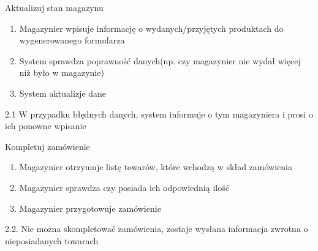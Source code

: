 	\begin{usecase}{Aktualizuj stan magazynu}
		\author{Arkadiusz Socha} 
		\maketitle
\begin{scenario}
 
			\begin{enumerate}
				\item Magazynier wpisuje informację o wydanych/przyjętych produktach do wygenerowanego formularza
				\item System sprawdza poprawność danych(np. czy magazynier nie wydał więcej niż było w magazynie)
				\item System aktualizje dane
			\end{enumerate}
		\end{scenario}
\begin{extensions}
		2.1 W przypadku błędnych danych, system informuje o tym magazyniera i prosi o ich ponowne wpisanie\\
	\end{extensions}
\end{usecase}

	\begin{usecase}{Kompletuj zamówienie}
		\author{Arkadiusz Socha} 
		\maketitle
\begin{scenario}
 
			\begin{enumerate}
				\item Magazynier otrzymuje listę towarów, które wchodzą w skład zamówienia
				\item Magazynier sprawdza czy posiada ich odpowiednią ilość
				\item Magazynier przygotowuje zamówienie
			\end{enumerate}
		\end{scenario}
\begin{extensions}
		2.2. Nie można skompletować zamówienia, zostaje wysłana informacja zwrotna o nieposiadanych towarach\\
	\end{extensions}
\end{usecase}

